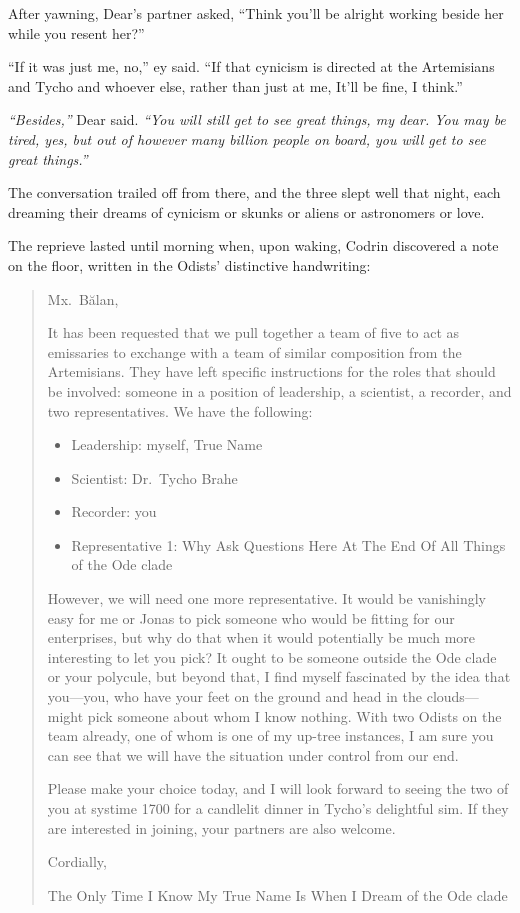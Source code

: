 After yawning, Dear's partner asked, ``Think you'll be alright working beside her while you resent her?''

``If it was just me, no,'' ey said. ``If that cynicism is directed at the Artemisians and Tycho and whoever else, rather than just at me, It'll be fine, I think.''

\emph{``Besides,''} Dear said. \emph{``You will still get to see great things, my dear. You may be tired, yes, but out of however many billion people on board, you will get to see great things.''}

The conversation trailed off from there, and the three slept well that night, each dreaming their dreams of cynicism or skunks or aliens or astronomers or love.

The reprieve lasted until morning when, upon waking, Codrin discovered a note on the floor, written in the Odists' distinctive handwriting:

\begin{quote}
Mx.~Bălan,

It has been requested that we pull together a team of five to act as emissaries to exchange with a team of similar composition from the Artemisians. They have left specific instructions for the roles that should be involved: someone in a position of leadership, a scientist, a recorder, and two representatives. We have the following:

\begin{itemize}
\tightlist
\item
  Leadership: myself, True Name
\item
  Scientist: Dr.~Tycho Brahe
\item
  Recorder: you
\item
  Representative 1: Why Ask Questions Here At The End Of All Things of the Ode clade
\end{itemize}

However, we will need one more representative. It would be vanishingly easy for me or Jonas to pick someone who would be fitting for our enterprises, but why do that when it would potentially be much more interesting to let you pick? It ought to be someone outside the Ode clade or your polycule, but beyond that, I find myself fascinated by the idea that you—you, who have your feet on the ground and head in the clouds—might pick someone about whom I know nothing. With two Odists on the team already, one of whom is one of my up-tree instances, I am sure you can see that we will have the situation under control from our end.

Please make your choice today, and I will look forward to seeing the two of you at systime 1700 for a candlelit dinner in Tycho's delightful sim. If they are interested in joining, your partners are also welcome.

Cordially,

The Only Time I Know My True Name Is When I Dream of the Ode clade
\end{quote}

